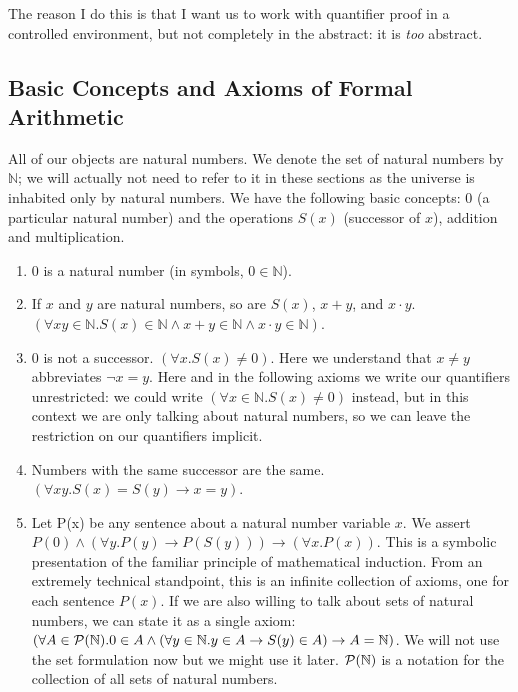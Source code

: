 \documentclass[12pt]{article}
\begin{document}
The reason I do this is that I want us to work with quantifier proof in a controlled environment, but not completely in the abstract:  it is {\em too\/} abstract.

\subsection{Basic Concepts and Axioms of Formal Arithmetic}

All of our objects are natural numbers.  We denote the set of natural
numbers by ${\mathbb N}$; we will actually not need to refer to it in
these sections as the universe is inhabited only by natural numbers.
We have the following basic concepts:  0 (a particular natural number)
and the operations $S(x)$ (successor of $x$), addition and multiplication.

\begin{enumerate}

\item 0 is a natural number (in symbols, $0 \in {\mathbb N}$).

\item If $x$ and $y$ are natural numbers, so are $S(x)$, $x+y$, and $x
\cdot y$.  $(\forall xy \in {\mathbb N}.S(x) \in {\mathbb N} \wedge
x+y \in {\mathbb N} \wedge x \cdot y \in {\mathbb N})$.

\item 0 is not a successor.  $(\forall x.S(x) \neq 0)$.  Here we
understand that $x\neq y$ abbreviates $\neg x=y$.  Here and in the
following axioms we write our quantifiers unrestricted: we could write
$(\forall x \in {\mathbb N}.S(x) \neq 0)$ instead, but in this context
we are only talking about natural numbers, so we can leave the
restriction on our quantifiers implicit.

\item Numbers with the same successor are the same.  $(\forall xy.S(x)
= S(y) \rightarrow x=y)$.

\item Let P(x) be any sentence about a natural number variable $x$.
We assert $P(0) \wedge (\forall y.P(y) \rightarrow P(S(y)))
\rightarrow (\forall x.P(x))$.  This is a symbolic presentation of the
familiar principle of mathematical induction.  From an extremely
technical standpoint, this is an infinite collection of axioms, one
for each sentence $P(x)$.  If we are also willing to talk about sets
of natural numbers, we can state it as a single axiom: $(\forall A \in
{\cal P}({\mathbb N}).0 \in A \wedge (\forall y \in {\mathbb N}.y \in
A \rightarrow S(y) \in A) \rightarrow A = {\mathbb N})$.  We will not
use the set formulation now but we might use it later.  ${\cal
P}({\mathbb N})$ is a notation for the collection of all sets of
natural numbers.


\end{enumerate}
\end{document}
